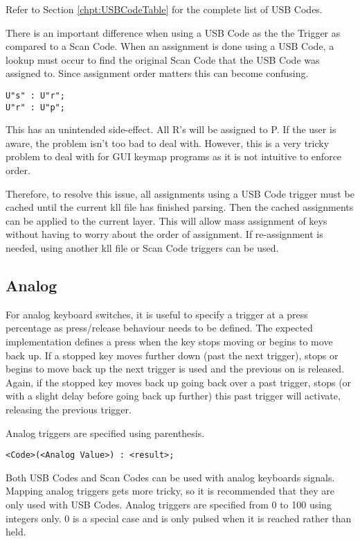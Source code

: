 \documentclass{kiibohd-template}
\begin{document}
Refer to Section \ref{chpt:USBCodeTable} for the complete list of USB Codes.

There is an important difference when using a USB Code as the the Trigger as compared to a Scan Code.
When an assignment is done using a USB Code, a lookup must occur to find the original Scan Code that the USB Code was assigned to.
Since assignment order matters this can become confusing.

\begin{lstlisting}
U"s" : U"r";
U"r" : U"p";
\end{lstlisting}

This has an unintended side-effect.
All R's will be assigned to P.
If the user is aware, the problem isn't too bad to deal with.
However, this is a very tricky problem to deal with for GUI keymap programs as it is not intuitive to enforce order.

Therefore, to resolve this issue, all assignments using a USB Code trigger must be cached until the current kll file has finished parsing.
Then the cached assignments can be applied to the current layer.
This will allow mass assignment of keys without having to worry about the order of assignment.
If re-assignment is needed, using another kll file or Scan Code triggers can be used.


\subsection{Analog}

For analog keyboard switches, it is useful to specify a trigger at a press percentage as press/release behaviour needs to be defined.
The expected implementation defines a press when the key stops moving or begins to move back up.
If a stopped key moves further down (past the next trigger), stops or begins to move back up the next trigger is used and the previous on is released.
Again, if the stopped key moves back up going back over a past trigger, stops (or with a slight delay before going back up further) this past trigger will activate, releasing the previous trigger.

Analog triggers are specified using parenthesis.

\begin{lstlisting}
<Code>(<Analog Value>) : <result>;
\end{lstlisting}

Both USB Codes and Scan Codes can be used with analog keyboards signals.
Mapping analog triggers gets more tricky, so it is recommended that they are only used with USB Codes.
Analog triggers are specified from 0 to 100 using integers only.
0 is a special case and is only pulsed when it is reached rather than held.
\end{document}
